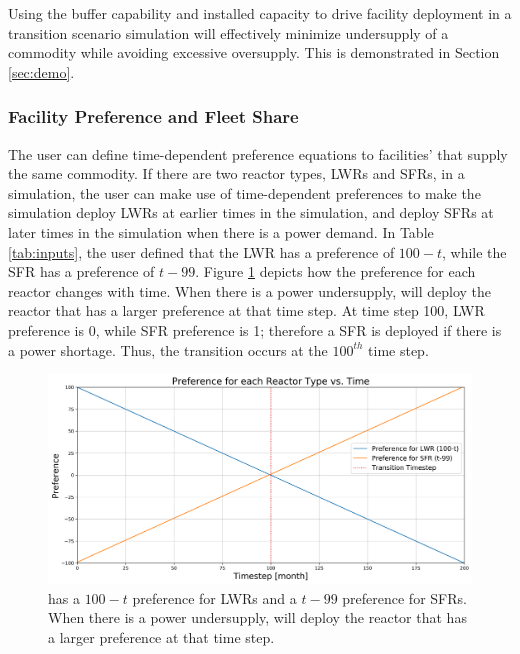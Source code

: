     Using the buffer capability and  
    installed capacity to drive facility deployment in a transition 
    scenario simulation will effectively minimize undersupply of a 
    commodity while avoiding excessive oversupply. 
    This is demonstrated in Section \ref{sec:demo}. 
    
    \subsubsection{\textbf{Facility Preference and Fleet Share}}
    \label{sec:pref}
    The user can define time-dependent preference equations to facilities'  
    that supply the same commodity. 
    If there are two reactor types, \glspl{LWR} and \glspl{SFR}, in a simulation, 
    the user can make use of time-dependent 
    preferences to make the simulation deploy LWRs at earlier times 
    in the simulation, and deploy SFRs at later times in the 
    simulation when there is a power demand. 
    In Table \ref{tab:inputs}, 
    the user defined that the LWR has a preference of $100-t$, while 
    the SFR has a preference of $t-99$. 
    Figure \ref{fig:prefplot} depicts how the preference for each reactor changes 
    with time. 
    When there is a power undersupply, \deploy will deploy the reactor that has a
    larger preference at that time step.
    At time step 100, LWR preference is 0, while SFR preference is 1; 
    therefore a SFR is deployed if there is a power shortage. 
    Thus, the transition occurs at the $100^{th}$ time step.

    \begin{figure}[]
        \begin{center}
            \includegraphics[width=\linewidth]{./figures/prefplot}
        \end{center}	
            \caption{\deploy has a $100-t$ preference for LWRs and a $t-99$ preference for SFRs.
            When there is a power undersupply, \deploy will deploy the reactor that has a
            larger preference at that time step.}
        \label{fig:prefplot}
    \end{figure}

